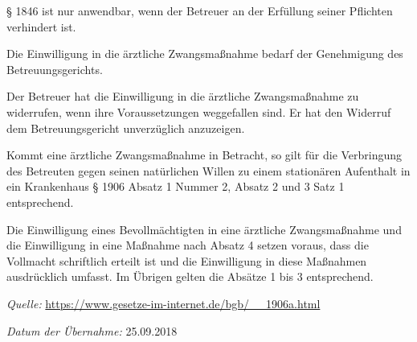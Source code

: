 \documentclass[pdftex,12pt,a4paper]{article}
\begin{document}
\begin{legal}
\begin{enumerate}
\end{enumerate}

§ 1846 ist nur anwendbar, wenn der Betreuer an der Erfüllung seiner Pflichten verhindert ist.

\item Die Einwilligung in die ärztliche Zwangsmaßnahme bedarf der Genehmigung des Betreuungsgerichts.

\item Der Betreuer hat die Einwilligung in die ärztliche Zwangsmaßnahme zu widerrufen, wenn ihre Voraussetzungen weggefallen sind. Er hat den Widerruf dem Betreuungsgericht unverzüglich anzuzeigen.

\item Kommt eine ärztliche Zwangsmaßnahme in Betracht, so gilt für die Verbringung des Betreuten gegen seinen natürlichen Willen zu einem stationären Aufenthalt in ein Krankenhaus § 1906 Absatz 1 Nummer 2, Absatz 2 und 3 Satz 1 entsprechend.

\item Die Einwilligung eines Bevollmächtigten in eine ärztliche Zwangsmaßnahme und die Einwilligung in eine Maßnahme nach Absatz 4 setzen voraus, dass die Vollmacht schriftlich erteilt ist und die Einwilligung in diese Maßnahmen ausdrücklich umfasst. Im Übrigen gelten die Absätze 1 bis 3 entsprechend.

\end{legal}

\textit{Quelle:} \url{https://www.gesetze-im-internet.de/bgb/__1906a.html}

\textit{Datum der Übernahme:} 25.09.2018
\end{document}
